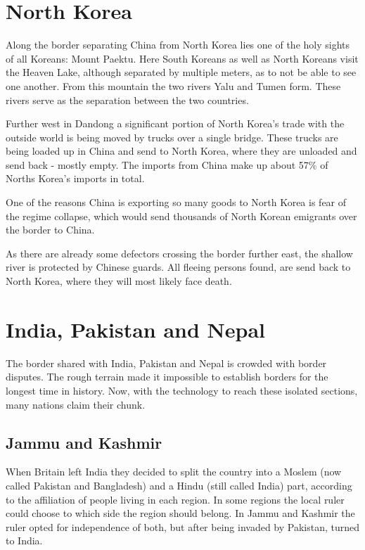 \documentclass[conference]{IEEEtran}
\begin{document}
	\section{North Korea}
	Along the border separating China from North Korea lies one of the holy sights of all Koreans: Mount Paektu. \cite{theIndianExpress_explainedWhatIsTheSignificanceOfMtPeaktuForKinJongUn} Here South Koreans as well as North Koreans visit the Heaven Lake, although separated by multiple meters, as to not be able to see one another. From this mountain the two rivers Yalu and Tumen form. These rivers serve as the separation between the two countries.
	
	Further west in Dandong a significant portion of North Korea's trade with the outside world is being moved by trucks over a single bridge. These trucks are being loaded up in China and send to North Korea, where they are unloaded and send back - mostly empty. The imports from China make up about 57\%\cite{wp_economyOfNorthKorea} of Norths Korea's imports in total.
	
	One of the reasons China is exporting so many goods to North Korea is fear of the regime collapse, which would send thousands of North Korean emigrants over the border to China.
	
	As there are already some defectors crossing the border further east, the shallow river is protected by Chinese guards.\cite{yp_anInconvenientBorderWhereChinaMeetsNorthKoreaABCNews} All fleeing persons found, are send back to North Korea, where they will most likely face death.
	
	\section{India, Pakistan and Nepal}
	The border shared with India, Pakistan and Nepal is crowded with border disputes. The rough terrain made it impossible to establish borders for the longest time in history. Now, with the technology to reach these isolated sections, many nations claim their chunk.
	
	\subsection{Jammu and Kashmir}
	When Britain left India they decided to split the country into a Moslem (now called Pakistan and Bangladesh) and a Hindu (still called India) part, according to the affiliation of people living in each region. In some regions the local ruler could choose to which side the region should belong. In Jammu and Kashmir the ruler opted for independence of both, but after being invaded by Pakistan, turned to India.
	
\end{document}
